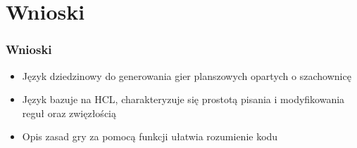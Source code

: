\documentclass{beamer}
\begin{document}
%

\section{Wnioski}

\begin{frame}
	\frametitle{Wnioski}

	\begin{itemize}
		\item Język dziedzinowy do generowania gier planszowych opartych o szachownicę
		\item Język bazuje na HCL, charakteryzuje się prostotą pisania i modyfikowania reguł oraz zwięzłością
		\item Opis zasad gry za pomocą funkcji ułatwia rozumienie kodu
	\end{itemize}
\end{frame}
\end{document}
